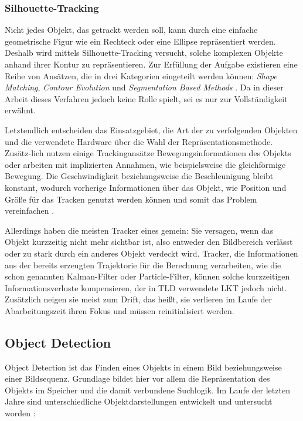 \subsubsection{Silhouette-Tracking}
Nicht jedes Objekt, das getrackt werden soll, kann durch eine einfache geometrische Figur wie ein Rechteck oder eine Ellipse repräsentiert werden. Deshalb wird mittels Silhouette-Tracking versucht, solche komplexen Objekte anhand ihrer Kontur zu repräsentieren. Zur Erfüllung der Aufgabe existieren eine Reihe von Ansätzen, die in drei Kategorien eingeteilt werden können: \textit{Shape Matching}\cite{TNO}, \textit{Contour Evolution}\cite{DMS} und \textit{Segmentation Based Methods} \cite{TGC}. Da in dieser Arbeit dieses Verfahren jedoch keine Rolle spielt, sei es nur zur Vollständigkeit erwähnt.

Letztendlich entscheiden das Einsatzgebiet, die Art der zu verfolgenden Objekten und die verwendete Hardware über die Wahl der Repräsentationsmethode. Zusätz-lich nutzen einige Trackingansätze Bewegungsinformationen des Objekts oder arbeiten mit implizierten Annahmen, wie beispielsweise die gleichförmige Bewegung. Die Geschwindigkeit beziehungsweise die Beschleunigung bleibt konstant, wodurch vorherige Informationen über das Objekt, wie Position und Größe für das Tracken genutzt werden können und somit das Problem vereinfachen \cite{OTS}.

Allerdings haben die meisten Tracker eines gemein: Sie versagen, wenn das Objekt kurzzeitig nicht mehr sichtbar ist, also entweder den Bildbereich verlässt oder zu stark durch ein anderes Objekt verdeckt wird. Tracker, die Informationen aus der bereits erzeugten Trajektorie für die Berechnung verarbeiten, wie die schon genannten Kalman-Filter oder Particle-Filter, können solche kurzzeitigen Informationsverluste kompensieren, der in TLD verwendete LKT jedoch nicht. Zusätzlich neigen sie meist zum Drift, das heißt, sie verlieren im Laufe der Abarbeitungszeit ihren Fokus und müssen reinitialisiert werden.

\subsection{Object Detection}
Object Detection ist das Finden eines Objekts in einem Bild beziehungsweise einer Bildsequenz. Grundlage bildet hier vor allem die Repräsentation des Objekts im Speicher und die damit verbundene Suchlogik. Im Laufe der letzten Jahre sind unterschiedliche Objektdarstellungen entwickelt und untersucht worden \cite{OTS}:


